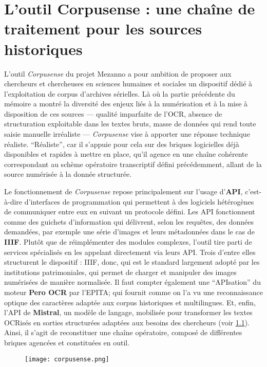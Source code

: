 \chapter{L'outil Corpusense : une chaîne de traitement pour les sources historiques}

L’outil \emph{Corpusense} du projet Mezanno a pour ambition de proposer aux chercheurs et chercheuses en sciences humaines et sociales un dispositif dédié à l’exploitation de corpus d’archives sérielles. Là où la partie précédente du mémoire a montré la diversité des enjeux liés à la numérisation et à la mise à disposition de ces sources — qualité imparfaite de l’OCR, absence de structuration exploitable dans les textes bruts, masse de données qui rend toute saisie manuelle irréaliste — \emph{Corpusense} vise à apporter une réponse technique réaliste. \enquote{Réaliste}, car il s’appuie pour cela sur des briques logicielles déjà disponibles et rapides à mettre en place, qu’il agence en une chaîne cohérente correspondant au schème opératoire transcriptif défini précédemment, allant de la source numérisée à la donnée structurée.

Le fonctionnement de \emph{Corpusense} repose principalement sur l’usage d’\textbf{API}, c’est-à-dire d’interfaces de programmation qui permettent à des logiciels hétérogènes de communiquer entre eux en suivant un protocole défini. Les API fonctionnent comme des guichets d'information qui délivrent, selon les requêtes, des données demandées, par exemple une série d'images et leurs métadonnées dans le cas de \textbf{IIIF}. Plutôt que de réimplémenter des modules complexes, l’outil tire parti de services spécialisés en les appelant directement via leurs API. Trois d’entre elles structurent le dispositif : IIIF, donc, qui est le standard largement adopté par les institutions patrimoniales, qui permet de charger et manipuler des images numérisées de manière normalisée. Il faut compter également une \enquote{APIsation} du moteur \textbf{Pero OCR} par l'EPITA; qui fournit comme on l'a vu une reconnaissance optique des caractères adaptée aux corpus historiques et multilingues. Et, enfin, l’API de \textbf{Mistral}, un modèle de langage, mobilisée pour transformer les textes OCRisés en sorties structurées adaptées aux besoins des chercheurs (voir \ref{fig:corpusense}). Ainsi, il s'agit de reconstituer une chaîne opératoire, composé de différentes briques agencées et constituées en outil.

\begin{figure}[htbp]
\centering
\texttt{[image: corpusense.png]}
\caption{}
\label{fig:corpusense}
\end{figure}

